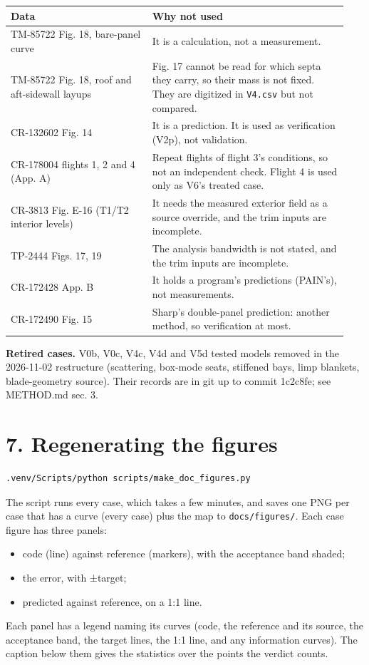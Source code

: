 \documentclass[10pt,a4paper]{article}
\begin{document}
{\small
\begin{longtable}{>{\raggedright\arraybackslash}p{0.392\linewidth}>{\raggedright\arraybackslash}p{0.548\linewidth}}
\hline
\textbf{Data} & \textbf{Why not used} \\
\hline
\endhead
TM-85722 Fig. 18, bare-panel curve & It is a calculation, not a measurement. \\
TM-85722 Fig. 18, roof and aft-sidewall layups & Fig. 17 cannot be read for which septa they carry, so their mass is not fixed. They are digitized in \texttt{V4.\allowbreak{}csv} but not compared. \\
CR-132602 Fig. 14 & It is a prediction. It is used as verification (V2p), not validation. \\
CR-178004 flights 1, 2 and 4 (App. A) & Repeat flights of flight 3's conditions, so not an independent check. Flight 4 is used only as V6's treated case. \\
CR-3813 Fig. E-16 (T1/T2 interior levels) & It needs the measured exterior field as a source override, and the trim inputs are incomplete. \\
TP-2444 Figs. 17, 19 & The analysis bandwidth is not stated, and the trim inputs are incomplete. \\
CR-172428 App. B & It holds a program's predictions (PAIN's), not measurements. \\
CR-172490 Fig. 15 & Sharp's double-panel prediction: another method, so verification at most. \\
\hline
\end{longtable}}

\textbf{Retired cases.} V0b, V0c, V4c, V4d and V5d tested models removed in the 2026-11-02 restructure (scattering, box-mode seats, stiffened bays, limp blankets, blade-geometry source). Their records are in git up to commit 1c2c8fe; see METHOD.md sec. 3.

\section*{7. Regenerating the figures}

\begin{Verbatim}[breaklines,fontsize=\small,frame=single,rulecolor=\color{gray}]
.venv/Scripts/python scripts/make_doc_figures.py
\end{Verbatim}

The script runs every case, which takes a few minutes, and saves one PNG per case that has a curve (every case) plus the map to \texttt{docs/\allowbreak{}figures/\allowbreak{}}. Each case figure has three panels:

\begin{itemize}
\item code (line) against reference (markers), with the acceptance band shaded;
\item the error, with ±target;
\item predicted against reference, on a 1:1 line.
\end{itemize}

Each panel has a legend naming its curves (code, the reference and its source, the acceptance band, the target lines, the 1:1 line, and any information curves). The caption below them gives the statistics over the points the verdict counts.
\end{document}

